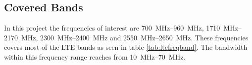 \subsection{Covered Bands}
In this project the frequencies of interest are \SIrange{700}{960}{MHz}, \SIrange{1710}{2170}{MHz}, \SIrange{2300}{2400}{MHz} and \SIrange{2550}{2650}{MHz}. These frequencies covers most of the LTE bands as seen in table \ref{tab:ltefreqband}. The bandwidth within this frequency range reaches from \SIrange{10}{70}{MHz}. 

